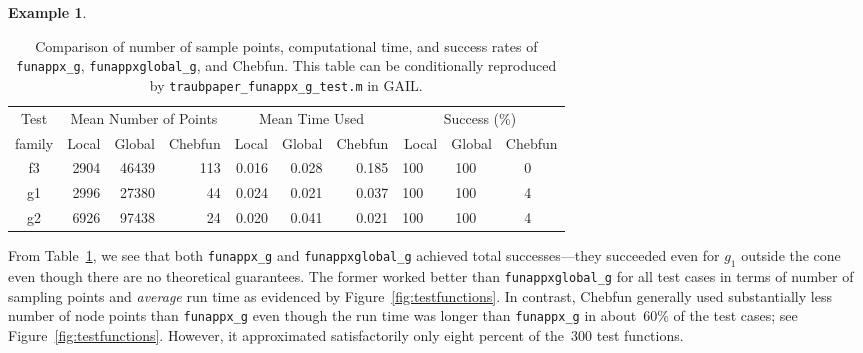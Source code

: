 \documentclass[review]{elsarticle}
\theoremstyle{definition}
\newtheorem{exmp}{Example}
\newcommand{\funappxg}{\texttt{funappx\_g}\xspace}
\newcommand{\funappxglobalg}{\texttt{funappxglobal\_g\xspace}}
\begin{document}
\begin{exmp}
%
\begin{table}[bt]
\centering
\caption{Comparison of number of sample points, computational time,  and success
rates of \funappxg, \funappxglobalg, and Chebfun.
This table can be conditionally reproduced by
\texttt{traubpaper\_funappx\_g\_test.m} in GAIL.}
\label{tab:localVsGlobalVsChebfun}
{\footnotesize
\setlength{\tabcolsep}{.5em} %
\begin{tabular}{|c|rrr|rrr|rrrrrr|}
\hline
    Test      &     \multicolumn{3}{c|}{Mean Number of Points} & \multicolumn{3}{c|}{Mean Time Used}  & \multicolumn{6}{|c|}{Success (\%)}
\\  family &  Local  &  Global    &  Chebfun    & Local     &  Global     & Chebfun      & \multicolumn{2}{r}{Local} & \multicolumn{2}{r}{Global} & \multicolumn{2}{r|}{Chebfun}
\\ \hline
          f3   &   2904  &   46439   &   113    &   0.016   &     0.028    &   0.185 &    100   &    &  100   &   &  0   &
\\        g1   &   2996  &   27380   &    44    &   0.024   &     0.021    &   0.037 &    100   &    &  100   &   &  4   &
\\        g2   &   6926  &   97438   &    24    &   0.020   &     0.041    &   0.021 &    100   &    &  100   &   &  4   &
\\ \hline	
\end{tabular}
}
\end{table}
%

From Table~\ref{tab:localVsGlobalVsChebfun}, we see that both \funappxg{} and
\funappxglobalg{} achieved total successes---they succeeded
even for  $g_1$ outside the cone even though there are no theoretical guarantees.
The former worked better than
\funappxglobalg{} for all test cases in terms of number of sampling points and
\emph{average} run time as evidenced by Figure~\ref{fig:testfunctions}.
In contrast, Chebfun generally used substantially less number of node points
than \funappxg{} even though the run time was longer than \funappxg{} in
about~60\% of the test cases; see Figure~\ref{fig:testfunctions}.
However, it approximated satisfactorily only eight percent of the~300 test
functions.



\end{exmp}
\end{document}
